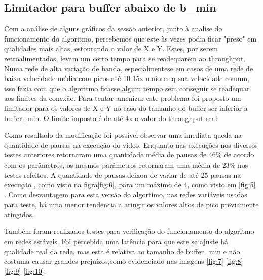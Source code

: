 \documentclass[10pt,twocolumn,letterpaper]{article}
\begin{document}
\subsection{Limitador para buffer abaixo de b\_min}

Com a análise de alguns gráficos da sessão anterior, junto à analise do funcionamento do algoritmo, percebemos que este às vezes podia ficar "preso" em qualidades mais altas, estourando o valor de X e Y. Estes, por serem retroalimentados, levam um certo tempo para se readequarem ao throughput. Numa rede de alta variação de banda, especialmentese em casos de uma rede de baixa velocidade média com picos até 10-15x maiores q sua velocidade comum, isso fazia com que o algoritmo ficasse algum tempo sem conseguir se readequar aos limites da conexão. Para tentar amenizar este problema foi proposto um limitador para os valores de X e Y no caso do tamanho do buffer ser inferior a buffer\_min. O limite imposto é de até 4x o valor do throughput real.

Como resultado da modificação foi possível observar uma imediata queda na quantidade de pausas na execução do vídeo. Enquanto nas execuções nos diversos testes anteriores retornaram uma quantidade média de pausas de 46\% de acordo com os parâmetros, os mesmos parâmetros retornaram uma média de 23\% nos testes refeitos. A quantidade de pausas deixou de variar de até 25 pausas na execução , como visto na figra\ref{fig:6}, para um máximo de 4, como visto em \ref{fig:5} . Como desvantagem para esta versão do algortimo, nas redes variáveis usadas para teste, há uma menor tendencia a atingir os valores altos de pico previamente atingidos.

Também foram realizados testes para verificação do funcionamento do algoritmo em redes estáveis. Foi percebida uma latência para que este se ajuste há qualidade real da rede, mas esta é relativa ao tamanho de buffer\_min e não costuma causar grandes prejuízos,como evidenciado nas imagens \ref{fig:7} \ref{fig:8} \ref{fig:9} \ref{fig:10}.
\end{document}
